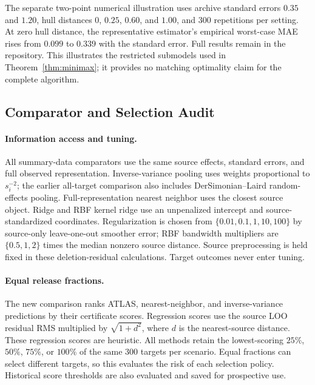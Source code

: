\label{app:minimax-check}
The separate two-point numerical illustration uses archive standard errors $0.35$ and $1.20$, hull distances $0$, $0.25$, $0.60$, and $1.00$, and 300 repetitions per setting. At zero hull distance, the representative estimator's empirical worst-case MAE rises from $0.099$ to $0.339$ with the standard error. Full results remain in the repository. This illustrates the restricted submodels used in Theorem~\ref{thm:minimax}; it provides no matching optimality claim for the complete algorithm.

\subsection{Comparator and Selection Audit}
\label{app:comparators}
\label{app:formal-ablations}

\paragraph{Information access and tuning.}
All summary-data comparators use the same source effects, standard errors, and full observed representation. Inverse-variance pooling uses weights proportional to $s_i^{-2}$; the earlier all-target comparison also includes DerSimonian--Laird random-effects pooling. Full-representation nearest neighbor uses the closest source object. Ridge and RBF kernel ridge use an unpenalized intercept and source-standardized coordinates. Regularization is chosen from $\{0.01,0.1,1,10,100\}$ by source-only leave-one-out smoother error; RBF bandwidth multipliers are $\{0.5,1,2\}$ times the median nonzero source distance. Source preprocessing is held fixed in these deletion-residual calculations. Target outcomes never enter tuning.

\paragraph{Equal release fractions.}
The new comparison ranks ATLAS, nearest-neighbor, and inverse-variance predictions by their certificate scores. Regression scores use the source LOO residual RMS multiplied by $\sqrt{1+d^2}$, where $d$ is the nearest-source distance. These regression scores are heuristic. All methods retain the lowest-scoring $25\%$, $50\%$, $75\%$, or $100\%$ of the same 300 targets per scenario. Equal fractions can select different targets, so this evaluates the risk of each selection policy. Historical score thresholds are also evaluated and saved for prospective use.

